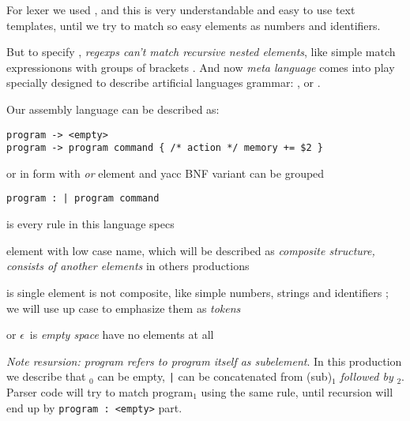 For lexer we used , and this is very understandable
and easy to use text templates, until we try to match so easy elements as
numbers and identifiers.

\bigskip
But to specify , \emph{regexps can't match
recursive nested elements}, like simple match expressionons with groups of
brackets \cite{dragon}. And now \emph{meta language} comes into play specially designed to describe artificial
languages grammar: , or .

\bigskip\noindent
Our assembly language can be described as:
\begin{lstlisting}
program -> <empty>
program -> program command { /* action */ memory += $2 }
\end{lstlisting}
or in form with \emph{or} element and yacc BNF variant can be grouped
\begin{lstlisting}
program : | program command
\end{lstlisting}

\begin{description}[nosep]
\item[\term{production}] is every rule in this language specs
\item[\term{nonterminal}] element with low case name, which will be
described as \emph{composite structure, consists of another elements} in others
productions
\item[\term{terminal}] is single element is not composite, like simple numbers,
strings and identifiers ; we will use up case to emphasize
them as \emph{tokens}
\item[\term{epsilon}] or $\epsilon$\ is \emph{empty space} have no elements
at all
\end{description}

\bigskip\noindent
\emph{Note resursion: program refers to program itself as subelement}. In this
production we describe that $_0$ can be empty,  \verb$|$
can be concatenated from (sub)$_1$ \emph{followed by}
$_2$. Parser code will  try to match program$_1$
using the same rule, until recursion will end up by \verb|program : <empty>|
part.

